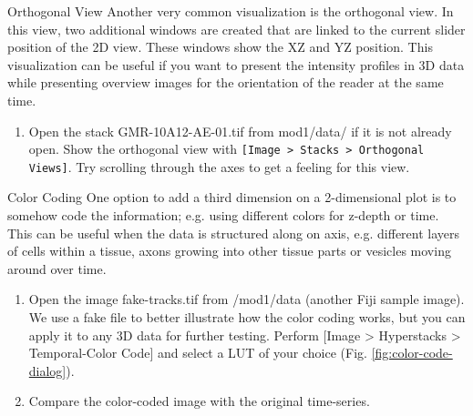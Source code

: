 \begin{taskbox}{Orthogonal View}
Another very common visualization is the orthogonal view. In this view, two additional windows are created that are linked to the current slider position of the 2D view. These windows show the XZ and YZ position. This visualization can be useful if you want to present the intensity profiles in 3D data while presenting overview images for the orientation of the reader at the same time.

\begin{enumerate}
	\item Open the stack GMR-10A12-AE-01.tif from mod1/data/ if it is not already open. Show the orthogonal view with \texttt{[Image > Stacks > Orthogonal Views]}. Try scrolling through the axes to get a feeling for this view.
\end{enumerate}

\end{taskbox}

\newpage
\begin{taskbox}{Color Coding}
One option to add a third dimension on a 2-dimensional plot is to somehow code the information; e.g. using different colors for z-depth or time. This can be useful when the data is structured along on axis, e.g. different layers of cells within a tissue, axons growing into other tissue parts or vesicles moving around over time.

\begin{enumerate}
	\item Open the image fake-tracks.tif from /mod1/data (another Fiji sample image). We use a fake file to better illustrate how the color coding works, but you can apply it to any 3D data for further testing. Perform [Image > Hyperstacks > Temporal-Color Code] and select a LUT of your choice (Fig. \ref{fig:color-code-dialog}).
	
	\begin{minipage}[t]{\linewidth}
		\begin{center}
		\medskip
		\label{fig:color-code-dialog}
		\end{center}
	\end{minipage}
	
	\item Compare the color-coded image with the original time-series.
\end{enumerate}

\end{taskbox}

